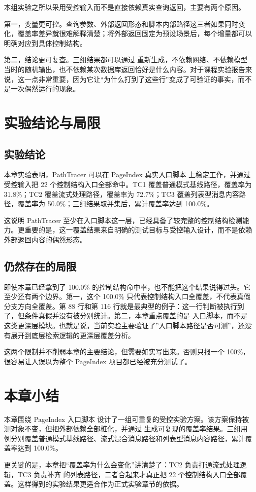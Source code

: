 本组实验之所以采用受控输入而不是直接依赖真实查询返回，主要有两个原因。

第一，变量更可控。查询参数、外部返回形态和脚本内部路径这三者如果同时变化，覆盖率差异就很难解释清楚；将外部返回固定为预设场景后，每个增量都可以明确对应到具体控制结构。

第二，结论更可复查。三组结果都可以通过  重新生成，不依赖网络、不依赖模型当时的随机输出，也不依赖某次数据库返回恰好是什么内容。对于课程实验报告来说，这一点非常重要，因为它让“为什么打到了这些行”变成了可验证的事实，而不是一次偶然运行的现象。

\section{实验结论与局限}

\subsection{实验结论}

本章实验表明，PathTracer 可以在 PageIndex 真实入口脚本  上稳定工作，并通过受控输入把 22 个控制结构入口全部命中。TC1 覆盖普通模式基线路径，覆盖率为 31.8\%；TC2 覆盖流式处理路径，覆盖率为 72.7\%；TC3 覆盖列表型消息内容路径，覆盖率为 50.0\%；三组结果取并集后，累计覆盖率达到 100.0\%。

这说明 PathTracer 至少在入口脚本这一层，已经具备了较完整的控制结构检测能力。更重要的是，这一覆盖结果来自明确的测试目标与受控输入设计，而不是依赖外部返回内容的偶然形态。

\subsection{仍然存在的局限}

即使本章已经拿到了 100.0\% 的控制结构命中率，也不能把这个结果说得过头。它至少还有两个边界。第一，这个 100.0\% 只代表控制结构入口全覆盖，不代表真假分支方向全覆盖。第 88 行和第 116 行就是最典型的例子：这一行判断被执行到了，但条件真假并没有被分别统计。第二，本章重点覆盖的是  入口脚本，而不是  这类更深层模块。也就是说，当前实验主要验证了”入口脚本路径是否可测”，还没有展开到底层检索逻辑的更深层覆盖分析。

这两个限制并不削弱本章的主要结论，但需要如实写出来。否则只报一个 100\%，很容易让人误以为整个 PageIndex 项目都已经被充分测试了。

\section{本章小结}

本章围绕 PageIndex 入口脚本  设计了一组可重复的受控实验方案。该方案保持被测对象不变，但把外部依赖全部桩化，并通过  生成可复现的覆盖率结果。三组用例分别覆盖普通模式基线路径、流式混合消息路径和列表型消息内容路径，累计覆盖率达到 100.0\%。

更关键的是，本章把“覆盖率为什么会变化”讲清楚了：TC2 负责打通流式处理逻辑，TC3 负责补齐  的列表路径，二者合起来才真正把 22 个控制结构入口全部覆盖。这样得到的实验结果更适合作为正式实验章节的依据。
